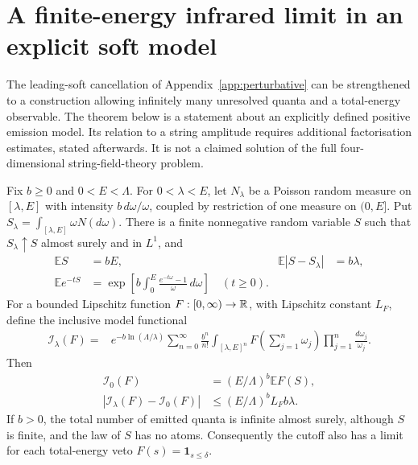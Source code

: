 \section{A finite-energy infrared limit in an explicit soft model}\label{app:infraredlimit}

The leading-soft cancellation of Appendix~\ref{app:perturbative} can be strengthened to a construction allowing infinitely many unresolved quanta and a total-energy observable. The theorem below is a statement about an explicitly defined positive emission model. Its relation to a string amplitude requires additional factorisation estimates, stated afterwards. It is not a claimed solution of the full four-dimensional string-field-theory problem.

\begin{theorem}\label{thm:softmeasure}
Fix $b\ge0$ and $0<E<\Lambda$. For $0<\lambda<E$, let $N_\lambda$ be a Poisson random measure on $[\lambda,E]$ with intensity $b\,d\omega/\omega$, coupled by restriction of one measure on $(0,E]$. Put $S_\lambda=\int_{[\lambda,E]}\omega N(d\omega)$. There is a finite nonnegative random variable $S$ such that $S_\lambda\uparrow S$ almost surely and in $L^1$, and
\begin{align}
\mathbb E S&=bE,&\mathbb E|S-S_\lambda|&=b\lambda,\\
\mathbb E e^{-tS}&=\exp\left[b\int_0^E\frac{e^{-t\omega}-1}{\omega}\,d\omega\right]\quad(t\ge0).
\end{align}
For a bounded Lipschitz function $F:[0,\infty)\to\mathbb{R}$, with Lipschitz constant $L_F$, define the inclusive model functional
\begin{align}
\mathcal I_\lambda(F)={}&e^{-b\ln(\Lambda/\lambda)}
\sum_{n=0}^{\infty}\frac{b^n}{n!}
\int_{[\lambda,E]^n}F\left(\sum_{j=1}^n\omega_j\right)
\prod_{j=1}^n\frac{d\omega_j}{\omega_j}.
\end{align}
Then
\begin{align}
\mathcal I_0(F)&=(E/\Lambda)^b\mathbb EF(S),\\
|\mathcal I_\lambda(F)-\mathcal I_0(F)|
&\le(E/\Lambda)^b L_F b\lambda.
\end{align}
If $b>0$, the total number of emitted quanta is infinite almost surely, although $S$ is finite, and the law of $S$ has no atoms. Consequently the cutoff also has a limit for each total-energy veto $F(s)=\mathbf1_{s\le\delta}$.
\end{theorem}


